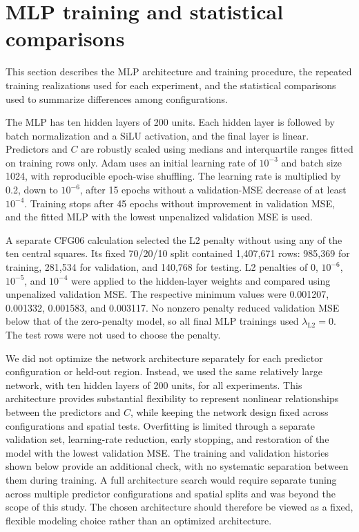 \documentclass[review,jog]{igs}
\begin{document}
\section{MLP training and statistical comparisons}
\label{app:training_campaign}

This section describes the MLP architecture and training procedure, the
repeated training realizations used for each experiment, and the statistical
comparisons used to summarize differences among configurations.

The MLP has ten hidden layers of 200 units. Each hidden layer is followed by batch normalization and a SiLU activation, and the final layer is linear. Predictors and $C$ are robustly scaled using medians and interquartile ranges fitted on training rows only. Adam uses an initial learning rate of $10^{-3}$ and batch size 1024, with reproducible epoch-wise shuffling. The learning rate is multiplied by 0.2, down to $10^{-6}$, after 15 epochs without a validation-MSE decrease of at least $10^{-4}$. Training stops after 45 epochs without improvement in validation MSE, and the fitted MLP with the lowest unpenalized validation MSE is used.

A separate CFG06 calculation selected the L2 penalty without using any of the ten central squares. Its fixed 70/20/10 split contained 1,407,671 rows: 985,369 for training, 281,534 for validation, and 140,768 for testing. L2 penalties of 0, $10^{-6}$, $10^{-5}$, and $10^{-4}$ were applied to the hidden-layer weights and compared using unpenalized validation MSE. The respective minimum values were 0.001207, 0.001332, 0.001583, and 0.003117. No nonzero penalty reduced validation MSE below that of the zero-penalty model, so all final MLP trainings used $\lambda_{\mathrm{L2}}=0$. The test rows were not used to choose the penalty. 

We did not optimize the network architecture separately for each predictor
configuration or held-out region. Instead, we used the same relatively large
network, with ten hidden layers of 200 units, for all experiments. This
architecture provides substantial flexibility to represent nonlinear
relationships between the predictors and $C$, while keeping the network
design fixed across configurations and spatial tests. Overfitting is limited
through a separate validation set, learning-rate reduction, early stopping,
and restoration of the model with the lowest validation MSE. The training and
validation histories shown below provide an additional check, with no
systematic separation between them during training. A full architecture search
would require separate tuning across multiple predictor configurations and
spatial splits and was beyond the scope of this study. The chosen architecture
should therefore be viewed as a fixed, flexible modeling choice rather than an
optimized architecture.
\end{document}
